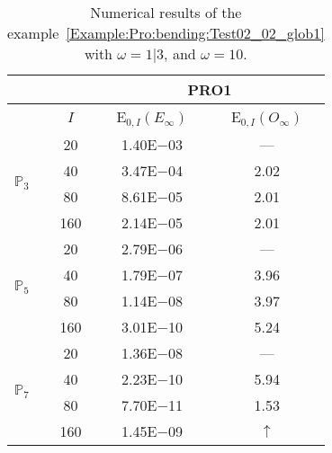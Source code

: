 \begin{table}[H]
\caption{Numerical results of the example~\ref{Example:Pro:bending:Test02_02_glob1} with $\omega=1|3$, and $\omega=10$.}
\setlength{\tabcolsep}{5pt}
\centering
\begin{tabular}{@{}l c c c@{}}
\toprule
 &  & \multicolumn{2}{c}{PRO1}\\
\midrule
 & $I$ & E$_{0,I}(E_{\infty})$ & E$_{0,I}(O_{\infty})$\\
\midrule
\multirow{4}{*}{$\mathbb{P}_{3}$} & 20 & 1.40E$-$03 & ---\\
 & 40 & 3.47E$-$04 & 2.02\\
 & 80 & 8.61E$-$05 & 2.01\\
 & 160 & 2.14E$-$05 & 2.01\\
\midrule
\multirow{4}{*}{$\mathbb{P}_{5}$} & 20 & 2.79E$-$06 & ---\\
 & 40 & 1.79E$-$07 & 3.96\\
 & 80 & 1.14E$-$08 & 3.97\\
 & 160 & 3.01E$-$10 & 5.24\\
\midrule
\multirow{4}{*}{$\mathbb{P}_{7}$} & 20 & 1.36E$-$08 & ---\\
 & 40 & 2.23E$-$10 & 5.94\\
 & 80 & 7.70E$-$11 & 1.53\\
 & 160 & 1.45E$-$09 & $\uparrow$\\
\bottomrule
\end{tabular}
\label{Table:PRO:test_02_02_test20}
\end{table}
